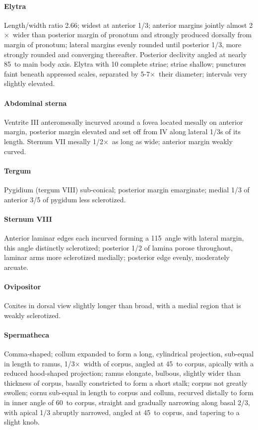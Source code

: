 \documentclass[fleqn,10pt,lineno]{wlpeerj} %
\newcommand{\td}{\textdegree~}
\newcommand{\x}{$\times$~}
\begin{document}
			\paragraph{Elytra}
				Length/width ratio 2.66; widest at anterior 1/3; anterior margins jointly almost 2\x wider than posterior margin of pronotum and strongly produced dorsally from margin of pronotum; lateral margins evenly rounded until posterior 1/3, more strongly rounded and converging thereafter. 
				Posterior declivity angled at nearly 85\td to main body axis. Elytra with 10 complete striae; striae shallow; punctures faint beneath appressed scales, separated by 5-7\x their diameter; intervals very slightly elevated.
			\paragraph{Abdominal sterna}
				Ventrite III anteromesally incurved around a fovea located mesally on anterior margin, posterior margin elevated and set off from IV along lateral 1/3s of its length. 
				Sternum VII mesally 1/2\x as long as wide; anterior margin weakly curved.
			\paragraph{Tergum}
				Pygidium (tergum VIII) sub-conical; posterior margin emarginate; medial 1/3 of anterior 3/5 of pygidum less sclerotized.		
			\paragraph{Sternum VIII}
				Anterior laminar edges each incurved forming a 115\td angle with lateral margin, this angle distinctly sclerotized; posterior 1/2 of lamina porose throughout, laminar arms more sclerotized medially; posterior edge evenly, moderately arcuate.
			\paragraph{Ovipositor}
				Coxites in dorsal view slightly longer than broad, with a medial region that is weakly sclerotized.
			\paragraph{Spermatheca}
				Comma-shaped; collum expanded to form a long, cylindrical projection, sub-equal in length to ramus, 1/3\x width of corpus, angled at 45\td to corpus, apically with a reduced hood-shaped projection; ramus elongate, bulbous, slightly wider than thickness of corpus, basally constricted to form a short stalk; corpus not greatly swollen; cornu sub-equal in length to corpus and collum, recurved distally to form in inner angle of 60\td to corpus, straight and gradually narrowing along basal 2/3, with apical 1/3 abruptly narrowed, angled at 45\td to coprus, and tapering to a slight knob.
\end{document}
